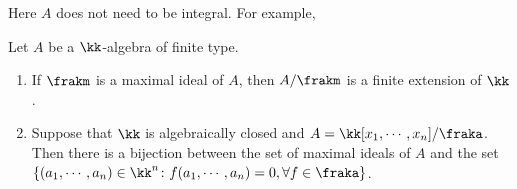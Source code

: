    \begin{remark}
        Here $A$ does not need to be integral. 
        For example, 
    \end{remark}

    \begin{theorem}\label{thm: Nullstellensatz}
        Let $A$ be a \(\kk\)-algebra of finite type.
        \begin{enumerate}
            \item If \(\frakm\) is a maximal ideal of \(A\), then \(A/\frakm\) is a finite extension of \(\kk\).
            \item Suppose that \(\kk\) is algebraically closed and \(A = \kk[x_1,\cdots,x_n]/\fraka\).
                Then there is a bijection between the set of maximal ideals of \(A\) and the set \( \{ (a_1,\cdots,a_n) \in \kk^n \colon f(a_1,\cdots,a_n) = 0, \forall f \in \fraka \} \).
        \end{enumerate}
    \end{theorem}
